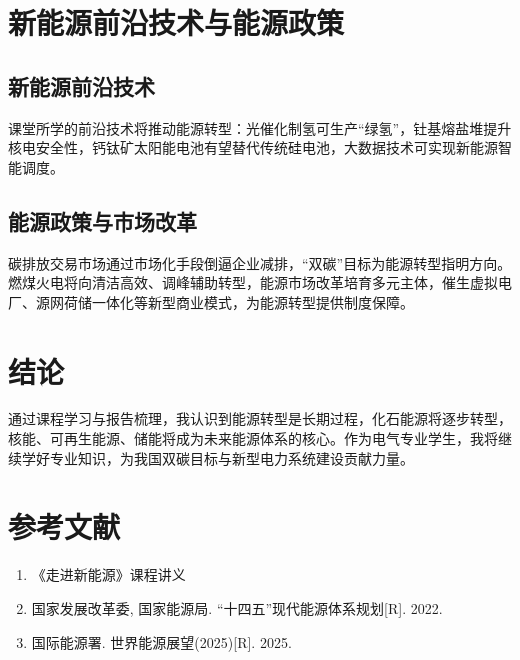 \documentclass[UTF8,a4paper,12pt]{article}
\begin{document}
\section{新能源前沿技术与能源政策}
\subsection{新能源前沿技术}
课堂所学的前沿技术将推动能源转型：光催化制氢可生产“绿氢”，钍基熔盐堆提升核电安全性，钙钛矿太阳能电池有望替代传统硅电池，大数据技术可实现新能源智能调度。

\subsection{能源政策与市场改革}
碳排放交易市场通过市场化手段倒逼企业减排，“双碳”目标为能源转型指明方向。燃煤火电将向清洁高效、调峰辅助转型，能源市场改革培育多元主体，催生虚拟电厂、源网荷储一体化等新型商业模式，为能源转型提供制度保障。

\section{结论}
通过课程学习与报告梳理，我认识到能源转型是长期过程，化石能源将逐步转型，核能、可再生能源、储能将成为未来能源体系的核心。作为电气专业学生，我将继续学好专业知识，为我国双碳目标与新型电力系统建设贡献力量。

\section{参考文献}
\begin{enumerate}
    \item 《走进新能源》课程讲义
    \item 国家发展改革委, 国家能源局. “十四五”现代能源体系规划[R]. 2022.
    \item 国际能源署. 世界能源展望(2025)[R]. 2025.
\end{enumerate}
\end{document}
